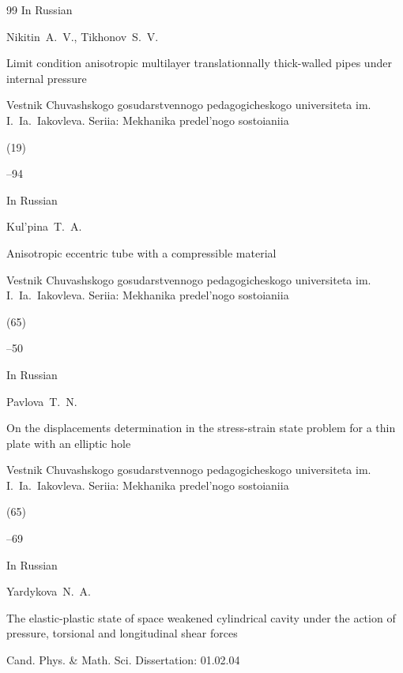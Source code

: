 \begin{thebibliography}{99}
\lang In Russian

\by Nikitin~A.~V., Tikhonov~S.~V.

\paper Limit condition anisotropic multilayer translationnally thick-walled pipes under internal pressure

\jour Vestnik Chuvashskogo gosudarstvennogo pedagogicheskogo universiteta im. I.~Ia.~Iakovleva. Seriia: Mekhanika predel'nogo sostoianiia


(19)

--94




\lang In Russian

\by Kul'pina~T.~A.

\paper Anisotropic eccentric tube  with a compressible material

\jour Vestnik Chuva\-shs\-kogo gosudarstvennogo pedagogicheskogo universiteta im. I.~Ia.~Iakovleva. Seriia: Mekhanika predel'nogo sostoianiia


(65)

--50






\lang In Russian

\by Pavlova~T.~N.

\paper On the displacements determination in the  stress-strain state  problem for a thin plate with an elliptic hole

\jour Vestnik Chuvashskogo gosudarstvennogo pedagogicheskogo universiteta im. I.~Ia.~Iakovleva. Seriia: Mekhanika predel'nogo sostoianiia


(65)

--69








\lang In Russian

\by Yardykova~N.~A.

\thesis The elastic-plastic state of space weakened cylindrical cavity under the action of pressure, torsional and longitudinal shear forces

\thesisinfo Cand. Phys. \& Math. Sci. Dissertation: 01.02.04


\end{thebibliography}

